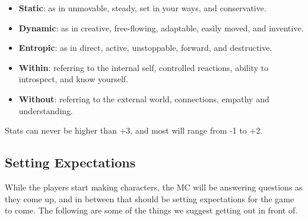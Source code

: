 \documentclass[
]{memoir}
\begin{document}
\begin{itemize}
\tightlist
\item
  \textbf{Static}: as in unmovable, steady, set in your ways, and
  conservative.
\item
  \textbf{Dynamic}: as in creative, free-flowing, adaptable, easily
  moved, and inventive.
\item
  \textbf{Entropic}: as in direct, active, unstoppable, forward, and
  destructive.
\item
  \textbf{Within}: referring to the internal self, controlled reactions,
  ability to introspect, and know yourself.
\item
  \textbf{Without}: referring to the external world, connections,
  empathy and understanding.
\end{itemize}

Stats can never be higher than +3, and most will range from -1 to +2.

\hypertarget{setting-expectations}{%
\subsection{Setting Expectations}\label{setting-expectations}}

While the players start making characters, the MC will be answering
questions as they come up, and in between that should be setting
expectations for the game to come. The following are some of the things
we suggest getting out in front of.
\end{document}
